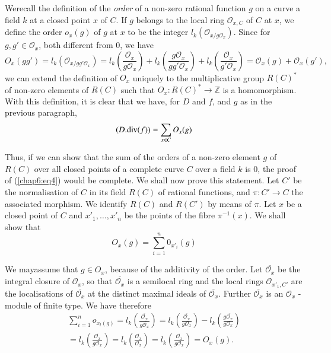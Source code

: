 We\pageoriginale recall the definition of the \textit{order} of a
non-zero rational 
function $g$ on a curve a field $k$ at a closed point $x$ of $C$. If
$g$ belongs to the local ring $\mathscr{O}_{x,C} $ of $C$ at $x$, we
define the order $o_x(g)$ of $g$ at $x$ to be the integer
$l_k(\mathscr{O}_{x/g\mathscr{O}_x})$. Since for
$g,g'\in\mathscr{O}_x$, both different from $0$, we have  
{\fontsize{10}{12}\selectfont
$$ 
O_x(gg')=l_k(\mathscr{O}_{x/gg'\mathscr{O}_x})= l_k
\left(\dfrac{\mathscr{O}_x}{g\mathscr{O}_x}\right) + l_k
\left(\dfrac{g\mathscr{O}_x}{gg'\mathscr{O}_x}\right) + l_k
\left(\dfrac{\mathscr{O}_x}{g'\mathscr{O}_x}\right) =
\mathscr{O}_x(g)+\mathscr{O}_x(g'),
$$}\relax    
we can extend the definition of $O_x$ uniquely to the multiplicative
group $R(C)^*$ of non-zero elements of $R(C)$ such that $O_x:R(C)^*\to
\mathbb{Z}$ is a homomorphism. With this definition, it is clear that
we have, for $D$ and $f$, and $g$ as in the previous paragraph,  
$$
(D. {\rm div} (f))=\sum_{x\in C} O_x(g)
$$

Thus, if we can show that the sum of the orders of a non-zero element
$g$ of $R(C)$ over all closed points of a complete curve $C$ over a
field $k$ is $0$, the proof of (\ref{chap6:eq4}) would be complete. We shall now
prove this statement. Let $C'$ be the normalisation of $C$ in its
field $R(C)$ of rational functions, and $\pi:C'\to C$ the associated
morphism. We identify $R(C)$ and $R(C')$  by means of $\pi$. Let $x$
be a closed point of $C$ and $x'_1,\ldots,x'_n$ be the points of the
fibre $\pi^{-1}(x)$. We shall show that  
$$
O_x(g)=\sum^n_{i=1} 0_{x'_i}(g)
$$

We may\pageoriginale  assume that $g\in O_x$, because of the additivity of the
order. Let $\overline{\mathscr{O}_x}$ be the integral closure of
$\mathscr{O}_x$, so that $\overline{\mathscr{O}_x}$ is a semilocal ring
and the local rings $\mathscr{O}_{x'_1,C'}$ are the localisations of
$\overline{\mathscr{O}_x}$  at the distinct maximal ideals of
$\overline{\mathscr{O}_x}$. Further $\overline{\mathscr{O}_x}$ is an
$\mathscr{O}_x$ -module of finite type. We have therefore
\begin{multline*}
  \sum\limits^n_{i=1} o_{x_l(g)}=l_k
  \left(\frac{\overline{\mathscr{O}_x}}{g{\overline{\mathscr{O}_x}}}\right)
  = l_k \left(\frac{\overline{\mathscr{O}_x}}{g{\mathscr{O}_x}}\right) -
  l_k \left(\frac{g\overline{\mathscr{O}_x}}{g{\mathscr{O}_x}}\right)\\
  =l_k \left(\frac{\overline{\mathscr{O}_x}}{g{\mathscr{O}_x}}\right)
  = l_k \left(\frac{\overline{\mathscr{O}_x}}{{\mathscr{O}_x}}\right)
  = l_k \left(\frac{\overline{\mathscr{O}_x}}{g{\mathscr{O}_x}}\right)
  = O_x(g). 
\end{multline*}

